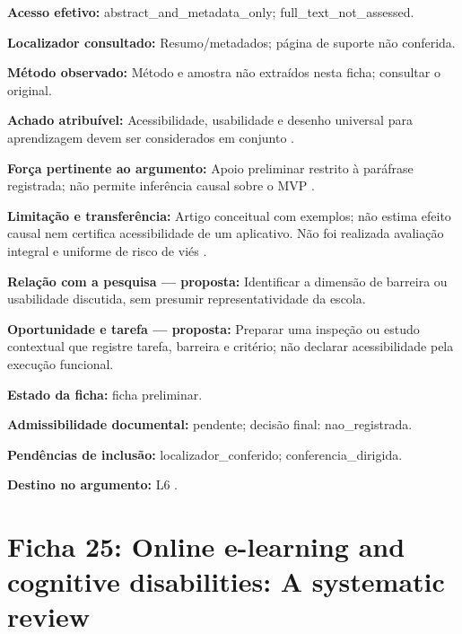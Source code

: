 \noindent\textbf{Acesso efetivo:} abstract\_and\_metadata\_only; full\_text\_not\_assessed.\par\medskip

\noindent\textbf{Localizador consultado:} Resumo/metadados; página de suporte não conferida.\par\medskip

\noindent\textbf{Método observado:} Método e amostra não extraídos nesta ficha; consultar o original.\par\medskip

\noindent\textbf{Achado atribuível:} Acessibilidade, usabilidade e desenho universal para aprendizagem devem ser considerados em conjunto \citep{choi2024}.\par\medskip

\noindent\textbf{Força pertinente ao argumento:} Apoio preliminar restrito à paráfrase registrada; não permite inferência causal sobre o MVP \citep{choi2024}.\par\medskip

\noindent\textbf{Limitação e transferência:} Artigo conceitual com exemplos; não estima efeito causal nem certifica acessibilidade de um aplicativo. Não foi realizada avaliação integral e uniforme de risco de viés \citep{choi2024}.\par\medskip

\noindent\textbf{Relação com a pesquisa — proposta:} Identificar a dimensão de barreira ou usabilidade discutida, sem presumir representatividade da escola.\par\medskip

\noindent\textbf{Oportunidade e tarefa — proposta:} Preparar uma inspeção ou estudo contextual que registre tarefa, barreira e critério; não declarar acessibilidade pela execução funcional.\par\medskip

\noindent\textbf{Estado da ficha:} ficha preliminar.\par\medskip

\noindent\textbf{Admissibilidade documental:} pendente; decisão final: nao\_registrada.\par\medskip

\noindent\textbf{Pendências de inclusão:} localizador\_conferido; conferencia\_dirigida.\par\medskip

\noindent\textbf{Destino no argumento:} L6 .

\clearpage\section*{Ficha 25: Online e-learning and cognitive disabilities: A systematic review}

